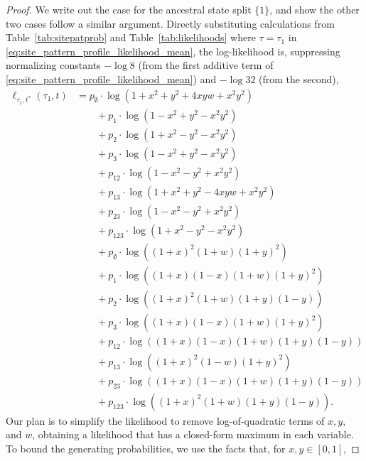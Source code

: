 \begin{proof}
We write out the case for the ancestral state split $\{1\}$, and show the other two cases follow a similar argument.
Directly substituting calculations from Table~\ref{tab:sitepatprob} and Table~\ref{tab:likelihoods} where $\tau = \tau_1$ in \eqref{eq:site_pattern_profile_likelihood_mean}, the log-likelihood is, suppressing normalizing constants $-\log 8$ (from the first additive term of \eqref{eq:site_pattern_profile_likelihood_mean}) and $-\log 32$ (from the second),
\begin{align}
    \label{eq:farris_likelihood}
    \ell_{\tau_1,t^*}(\tau_1, t)
    &=        p_{\emptyset}  \cdot\log(1+x^2+y^2+4xyw+x^2y^2) \nonumber \\
    &\qquad + p_{1}          \cdot\log(1-x^2+y^2-x^2y^2) \nonumber \\
    &\qquad + p_{2}          \cdot\log(1+x^2-y^2-x^2y^2) \nonumber \\
    &\qquad + p_{3}          \cdot\log(1-x^2+y^2-x^2y^2) \nonumber \\
    &\qquad + p_{12}         \cdot\log(1-x^2-y^2+x^2y^2) \nonumber \\
    &\qquad + p_{13}         \cdot\log(1+x^2+y^2-4xyw+x^2y^2) \nonumber \\
    &\qquad + p_{23}         \cdot\log(1-x^2-y^2+x^2y^2) \nonumber \\
    &\qquad + p_{123}        \cdot\log(1+x^2-y^2-x^2y^2) \nonumber \\
    &\qquad + p_{\emptyset}  \cdot\log((1+x)^2   (1+w)(1+y)^2) \nonumber \\
    &\qquad + p_{1}          \cdot\log((1+x)(1-x)(1+w)(1+y)^2) \nonumber \\
    &\qquad + p_{2}          \cdot\log((1+x)^2   (1+w)(1+y)(1-y)) \nonumber \\
    &\qquad + p_{3}          \cdot\log((1+x)(1-x)(1+w)(1+y)^2) \nonumber \\
    &\qquad + p_{12}         \cdot\log((1+x)(1-x)(1+w)(1+y)(1-y)) \nonumber \\
    &\qquad + p_{13}         \cdot\log((1+x)^2   (1-w)(1+y)^2) \nonumber \\
    &\qquad + p_{23}         \cdot\log((1+x)(1-x)(1+w)(1+y)(1-y)) \nonumber \\
    &\qquad + p_{123}        \cdot\log((1+x)^2   (1+w)(1+y)(1-y)).
\end{align}
Our plan is to simplify the likelihood to remove log-of-quadratic terms of $x,y,$ and $w$, obtaining a likelihood that has a closed-form maximum in each variable.
To bound the generating probabilities, we use the facts that, for $x,y\in[0,1]$,

\end{proof}
